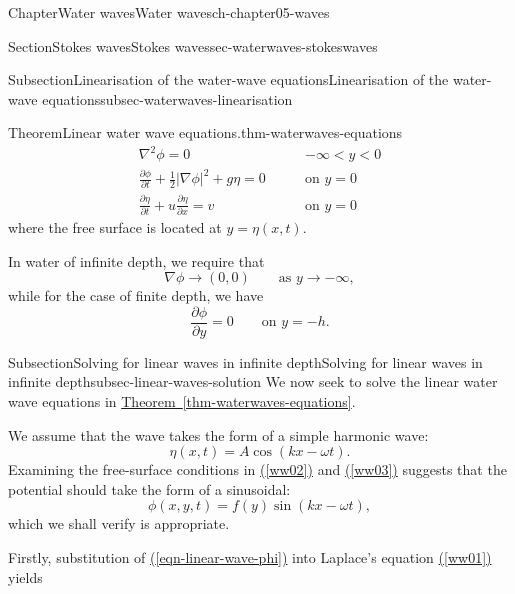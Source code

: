 \documentclass[oneside,10pt,]{book}
\newcommand{\xreffont}{\relax}
\numberwithin{equation}{section}
\newcommand{\pd}[2]{\frac{\partial#1}{\partial#2}}
\begin{document}
\begin{chapterptx}{Chapter}{Water waves}{}{Water waves}{}{}{ch-chapter05-waves}
\begin{sectionptx}{Section}{Stokes waves}{}{Stokes waves}{}{}{sec-waterwaves-stokeswaves}
\begin{subsectionptx}{Subsection}{Linearisation of the water-wave equations}{}{Linearisation of the water-wave equations}{}{}{subsec-waterwaves-linearisation}
\begin{theorem}{Theorem}{Linear water wave equations.}{}{thm-waterwaves-equations}
\begin{align}
\nabla^2 \phi = 0 & \qquad \text{$-\infty < y < 0$}\label{ww01}\\
\pd{\phi}{t} + \frac{1}{2} |\nabla \phi|^2 + g\eta = 0 & \qquad \text{on $y = 0$}\label{ww02}\\
\pd{\eta}{t} + u \pd{\eta}{x} = v & \qquad \text{on $y = 0$}\label{ww03}
\end{align}
where the free surface is located at \(y = \eta(x, t)\).%
\par
In water of infinite depth, we require that%
\begin{equation}
\nabla\phi \to (0, 0) \qquad \text{as $y \to -\infty$},\label{ww04-inf}
\end{equation}
while for the case of finite depth, we have%
\begin{equation}
\pd{\phi}{y} = 0 \qquad \text{on $y = -h$}.\label{thm-waterwaves-equations-2-2-2}
\end{equation}
%
\end{theorem}
\end{subsectionptx}
%
%
\typeout{************************************************}
\typeout{************************************************}
%
\begin{subsectionptx}{Subsection}{Solving for linear waves in infinite depth}{}{Solving for linear waves in infinite depth}{}{}{subsec-linear-waves-solution}
We now seek to solve the linear water wave equations in \hyperref[thm-waterwaves-equations]{Theorem~{\xreffont\ref{thm-waterwaves-equations}}}.%
\par
We assume that the wave takes the form of a simple harmonic wave:%
\begin{equation}
\eta(x, t) = A\cos(kx - \omega t). \label{eqn-linear-wave}
\end{equation}
Examining the free-surface conditions in \hyperref[ww02]{({\xreffont\ref{ww02}})} and \hyperref[ww03]{({\xreffont\ref{ww03}})} suggests that the potential should take the form of a sinusoidal:%
\begin{equation}
\phi(x, y, t) = f(y) \sin(kx - \omega t),\label{eqn-linear-wave-phi}
\end{equation}
which we shall verify is appropriate.%
\par
Firstly, substitution of \hyperref[eqn-linear-wave-phi]{({\xreffont\ref{eqn-linear-wave-phi}})} into Laplace's equation \hyperref[ww01]{({\xreffont\ref{ww01}})} yields%
\begin{equation}

\end{equation}
\end{subsectionptx}
\end{sectionptx}
\end{chapterptx}
\end{document}
